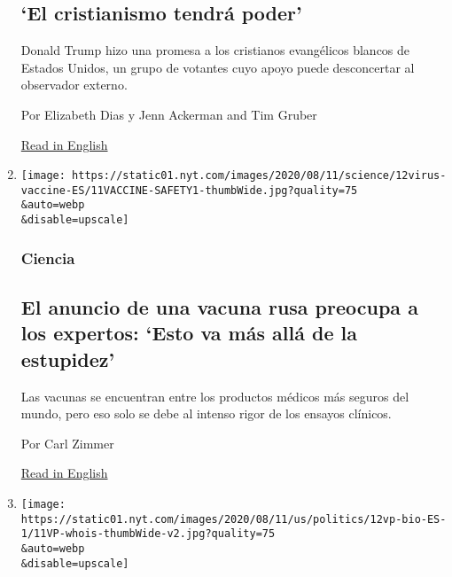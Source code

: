 \begin{enumerate}
  \hypertarget{el-cristianismo-tendruxe1-poder}{%
  \subsection{`El cristianismo tendrá
  poder'}\label{el-cristianismo-tendruxe1-poder}}

  Donald Trump hizo una promesa a los cristianos evangélicos blancos de
  Estados Unidos, un grupo de votantes cuyo apoyo puede desconcertar al
  observador externo.

  Por Elizabeth Dias y Jenn Ackerman and Tim Gruber

  \href{https://www.nytimes.com/2020/08/09/us/evangelicals-trump-christianity.html}{Read
  in English}
\item
  \href{/es/2020/08/12/espanol/ciencia-y-tecnologia/vacuna-rusia-coronavirus.html}{}

  \texttt{[image: https://static01.nyt.com/images/2020/08/11/science/12virus-vaccine-ES/11VACCINE-SAFETY1-thumbWide.jpg?quality=75\\\&auto=webp\\\&disable=upscale]}

  \hypertarget{ciencia}{%
  \subsubsection{Ciencia}\label{ciencia}}

  \hypertarget{el-anuncio-de-una-vacuna-rusa-preocupa-a-los-expertos-esto-va-muxe1s-alluxe1-de-la-estupidez}{%
  \subsection{El anuncio de una vacuna rusa preocupa a los expertos:
  `Esto va más allá de la
  estupidez'}\label{el-anuncio-de-una-vacuna-rusa-preocupa-a-los-expertos-esto-va-muxe1s-alluxe1-de-la-estupidez}}

  Las vacunas se encuentran entre los productos médicos más seguros del
  mundo, pero eso solo se debe al intenso rigor de los ensayos clínicos.

  Por Carl Zimmer

  \href{https://www.nytimes.com/2020/08/11/health/russia-covid-19-vaccine-safety.html}{Read
  in English}
\item
  \href{/es/2020/08/12/espanol/estados-unidos/quien-es-kamala-harris-vicepresidenta.html}{}

  \texttt{[image: https://static01.nyt.com/images/2020/08/11/us/politics/12vp-bio-ES-1/11VP-whois-thumbWide-v2.jpg?quality=75\\\&auto=webp\\\&disable=upscale]}


\end{enumerate}
